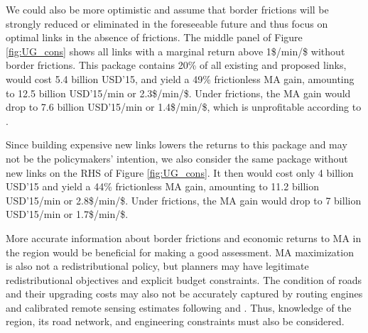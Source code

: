 \documentclass[a4paper]{article}
\begin{document}
We could also be more optimistic and assume that border frictions will be strongly reduced or eliminated in the foreseeable future and thus focus on optimal links in the absence of frictions. The middle panel of Figure \ref{fig:UG_cons} shows all links with a marginal return above 1\$/min/\$ without border frictions. This package contains 20\% of all existing and proposed links, would cost 5.4 billion USD'15, and yield a 49\% frictionless MA gain, amounting to 12.5 billion USD'15/min or 2.3\$/min/\$. Under frictions, the MA gain would drop to 7.6 billion USD'15/min or 1.4\$/min/\$, which is unprofitable according to \citet{krantz2024optimal}. \newline


Since building expensive new links lowers the returns to this package and may not be the policymakers' intention, we also consider the same package without new links on the RHS of Figure \ref{fig:UG_cons}. It then would cost only 4 billion USD'15 and yield a 44\% frictionless MA gain, amounting to 11.2 billion USD'15/min or 2.8\$/min/\$. Under frictions, the MA gain would drop to 7 billion USD'15/min or 1.7\$/min/\$. \newline 

More accurate information about border frictions and economic returns to MA in the region would be beneficial for making a good assessment. MA maximization is also not a redistributional policy, but planners may have legitimate redistributional objectives and explicit budget constraints. The condition of roads and their upgrading costs may also not be accurately captured by routing engines and calibrated remote sensing estimates following \citet{collier2016cost} and \citet{fajgelbaum2020optimal}. Thus, knowledge of the region, its road network, and engineering constraints must also be considered. \newline 
\end{document}
